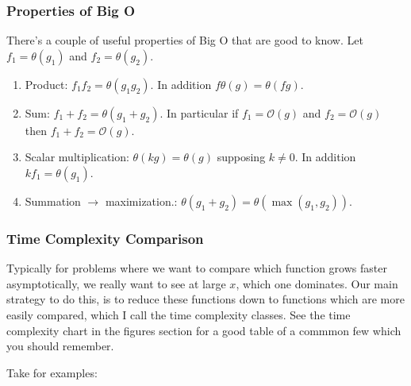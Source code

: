 \subsubsection{Properties of Big O}

There's a couple of useful properties of Big O that are good to know. Let $f_1 =
\theta(g_1)$ and $f_2 = \theta(g_2)$.

\begin{enumerate}[(1)]

\item Product: $f_1f_2 = \theta(g_1g_2)$. In addition $f \theta(g) =
\theta(fg)$.

\item Sum: $f_1 + f_2 = \theta(g_1 + g_2)$. In particular if $f_1 =
\mathcal{O}(g)$ and $f_2 = \mathcal{O}(g)$ then $f_1+f_2 = \mathcal{O}(g)$.

\item Scalar multiplication: $\theta(kg) = \theta(g)$ supposing $k \neq 0$. In
addition $kf_1 = \theta(g_1)$.

\item Summation $\to$ maximization.: $\theta(g_1 + g_2) = \theta(\max(g_1,
g_2))$. 

\end{enumerate}

\subsubsection{Time Complexity Comparison}

Typically for problems where we want to compare which function grows faster
asymptotically, we really want to see at large $x$, which one dominates. Our
main strategy to do this, is to reduce these functions down to functions which
are more easily compared, which I call the time complexity classes. See the time
complexity chart in the figures section for a good table of a commmon few which
you should remember. 

Take for examples:

